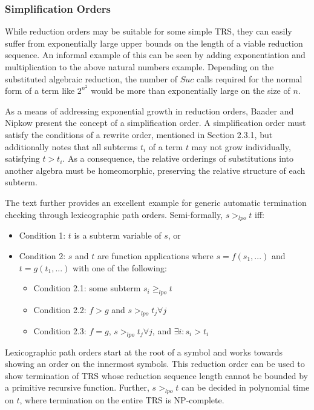 \documentclass{article}
\begin{document}
\subsubsection{Simplification Orders}
While reduction orders may be suitable for some simple TRS, they can easily suffer from exponentially large upper bounds on the length of a viable reduction sequence.
An informal example of this can be seen by adding exponentiation and multiplication to the above natural numbers example.
Depending on the substituted algebraic reduction, the number of $Suc$ calls required for the normal form of a term like $2^{n^2}$ would be
more than exponentially large on the size of $n$.

As a means of addressing exponential growth in reduction orders, Baader and Nipkow \cite{baader1998term} present the concept of a simplification order.
A simplification order must satisfy the conditions of a rewrite order, mentioned in Section 2.3.1, but additionally notes that all subterms $t_i$ of a term $t$
may not grow individually, satisfying $t > t_i$. As a consequence, the relative orderings of substitutions into another algebra must be homeomorphic, preserving the relative
structure of each subterm.

The text further provides an excellent example for generic automatic termination checking through lexicographic path orders. Semi-formally, $s >_{lpo} t$ iff:
\begin{itemize}
    \item Condition 1: $t$ is a subterm variable of $s$, or
    \item Condition 2: $s$ and $t$ are function applications where $s = f(s_1, ...)$ and $t = g(t_1,...)$ with one of the following:
    \begin{itemize}
        \item Condition 2.1: some subterm $s_i \geq_{lpo} t$
        \item Condition 2.2: $f > g$ and $s >_{lpo} t_j \forall j$
        \item Condition 2.3: $f = g$, $s >_{lpo} t_j \forall j$, and $\exists i: s_i > t_i$
    \end{itemize}
\end{itemize}
Lexicographic path orders start at the root of a symbol and works towards showing an order on the innermost symbols.
This reduction order can be used to show termination of TRS whose reduction sequence length cannot be bounded by a primitive recursive function.
Further, $s >_{lpo} t$ can be decided in polynomial time on $t$, where termination on the entire TRS is NP-complete.
\end{document}
